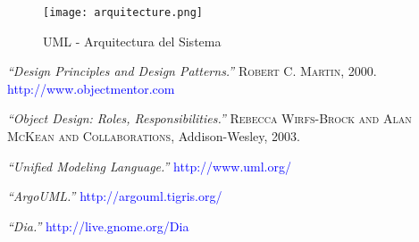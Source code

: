 \documentclass[12pt,a4paper,spanish]{article}
\begin{document}
\begin{figure}[!hbtp]
	\begin{center}
		\texttt{[image: arquitecture.png]}
		\caption{UML - Arquitectura del Sistema}
		\label{arquitecture}
	\end{center}
\end{figure}





\begin{thebibliography}{99}
\small  {} {\em{“Design Principles and Design Patterns.”}} 
		\textsc{Robert C. Martin}, 2000. \textcolor{blue}{http://www.objectmentor.com}
  
\small  {} {\em{“Object Design: Roles, Responsibilities.”}} 
		\textsc{Rebecca Wirfs-Brock and Alan McKean and Collaborations}, Addison-Wesley, 2003.  

\small  {} {\em{“Unified Modeling Language.”}} \textcolor{blue}{http://www.uml.org/}

\small  {} {\em{“ArgoUML.”}} \textcolor{blue}{http://argouml.tigris.org/}

\small {} {\em{“Dia.”}} \textcolor{blue}{http://live.gnome.org/Dia}
\end{thebibliography}
\end{document}
